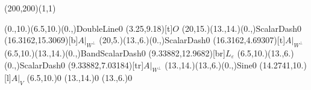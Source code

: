 \unitlength=1bp%

\begin{feynartspicture}(200,200)(1,1)

\FADiagram{}
\FAProp(0.,10.)(6.5,10.)(0.,){DoubleLine}{0}
\FALabel(3.25,9.18)[t]{$O$}
\FAProp(20,15.)(13.,14.)(0.,){ScalarDash}{0}
\FALabel(16.3162,15.3069)[b]{$A|_{W^\perp}$}
\FAProp(20,5.)(13.,6.)(0.,){ScalarDash}{0}
\FALabel(16.3162,4.69307)[t]{$A|_{W^\perp}$}
\FAProp(6.5,10.)(13.,14.)(0.,){BandScalarDash}{0}
\FALabel(9.33882,12.9682)[br]{$L_\varepsilon$}
\FAProp(6.5,10.)(13.,6.)(0.,){ScalarDash}{0}
\FALabel(9.33882,7.03184)[tr]{$A|_{W^\perp}$}
\FAProp(13.,14.)(13.,6.)(0.,){Sine}{0}
\FALabel(14.2741,10.)[l]{$A|_V$}
\FAVert(6.5,10.){0}
\FAVert(13.,14.){0}
\FAVert(13.,6.){0}
\end{feynartspicture}

